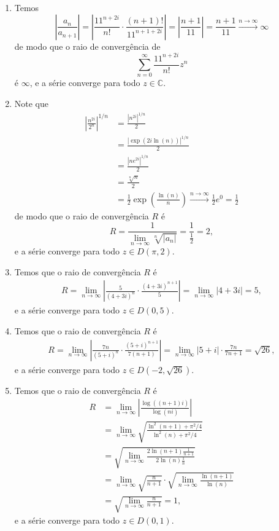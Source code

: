 \documentclass[12pt,a4paper]{article}
\begin{document}
\begin{enumerate}
\begin{enumerate}
			\item Temos
			$$
			\left| \frac{a_n}{a_{n+1}} \right| = \left| \frac{11^{n+2i}}{n!}\cdot \frac{(n+1)!}{11^{n+1+2i}} \right| = \left| \frac{n+1}{11} \right| = \frac{n+1}{11} \xrightarrow{n\to\infty} \infty 
			$$
			de modo que o raio de convergência de 
			$$
			\sum_{n=0}^{\infty}\frac{11^{n+2i}}{n!}z^n 
			$$
			é $\infty$, e a série converge para todo $z\in \mathbb{C}$.
			
			\item Note que 
			\begin{align*}
			\left| \frac{n^{2i}}{2^n} \right|^{1/n} &= \frac{\left| n^{2i} \right|^{1/n}}{2} \\ 
			&= \frac{\left| \exp\left( 2i\ln(n) \right) \right|^{1/n}}{2} \\
			&= \frac{\left| ne^{2i} \right|^{1/n}}{2} \\
			&= \frac{\sqrt[n]{n}}{2} \\
			&= \frac{1}{2}\exp\left(\frac{\ln(n)}{n}\right) \xrightarrow{n\to\infty}\frac{1}{2}e^0 = \frac{1}{2}
			\end{align*} 
			de modo que o raio de convergência $R$ é
			$$
			R = \frac{1}{\lim\limits_{n\to\infty}\sqrt[n]{|a_n|}} = \frac{1}{\frac{1}{2}} = 2,
			$$
			e a série converge para todo $z\in D(\pi,2)$.
			
			\item Temos que o raio de convergência $R$ é
			\begin{align*}
			R = \lim\limits_{n\to\infty} \left| \frac{5}{(4+3i)^n}\cdot\frac{(4+3i)^{n+1}}{5} \right| = \lim\limits_{n\to\infty} |4+3i| = 5,
			\end{align*}
			e a série converge para todo $z\in D(0,5)$.
			
			\item Temos que o raio de convergência $R$ é
			\begin{align*}
			R = \lim\limits_{n\to\infty} \left| \frac{7n}{(5+i)^n}\cdot\frac{(5+i)^{n+1}}{7(n+1)} \right| = \lim\limits_{n\to\infty} |5+i|\cdot\frac{7n}{7n+1} = \sqrt{26},
			\end{align*}
			e a série converge para todo $z\in D(-2,\sqrt{26})$.
			
			\item Temos que o raio de convergência $R$ é
			\begin{align*}
			R &= \lim\limits_{n\to\infty} \left| \frac{\log((n+1)i)}{\log(ni)} \right| \\
			&= \lim\limits_{n\to\infty}\sqrt{\frac{\ln^2(n+1) + \pi^2/4}{\ln^2(n) + \pi^2/4}} \\
			&= \sqrt{\lim\limits_{n\to\infty} \frac{2\ln(n+1)\frac{1}{n+1}}{2\ln(n)\frac{1}{n}} } \\
			&= \lim\limits_{n\to\infty} \sqrt{\frac{n}{n+1}}\cdot\sqrt{\lim\limits_{n\to\infty}\frac{\ln(n+1)}{\ln(n)}} \\
			&= \sqrt{\lim\limits_{n\to\infty}\frac{n}{n+1}} = 1,
			\end{align*}
			e a série converge para todo $z\in D(0,1)$.
			

\end{enumerate}
\end{enumerate}
\end{document}

